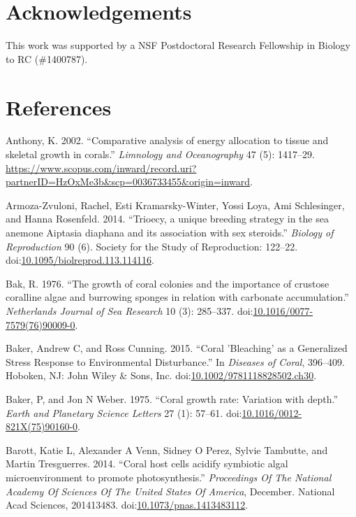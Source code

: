 \documentclass[]{elsarticle} %
\begin{document}
\section{Acknowledgements}\label{acknowledgements}

This work was supported by a NSF Postdoctoral Research Fellowship in
Biology to RC (\#1400787).

\section*{References}\label{references}

\hypertarget{refs}{}
\hypertarget{ref-Anthony:2002tc}{}
Anthony, K. 2002. ``Comparative analysis of energy allocation to tissue
and skeletal growth in corals.'' \emph{Limnology and Oceanography} 47
(5): 1417--29.
\url{https://www.scopus.com/inward/record.uri?partnerID=HzOxMe3b\&scp=0036733455\&origin=inward}.

\hypertarget{ref-ArmozaZvuloni:2014ju}{}
Armoza-Zvuloni, Rachel, Esti Kramarsky-Winter, Yossi Loya, Ami
Schlesinger, and Hanna Rosenfeld. 2014. ``Trioecy, a unique breeding
strategy in the sea anemone Aiptasia diaphana and its association with
sex steroids.'' \emph{Biology of Reproduction} 90 (6). Society for the
Study of Reproduction: 122--22.
doi:\href{https://doi.org/10.1095/biolreprod.113.114116}{10.1095/biolreprod.113.114116}.

\hypertarget{ref-Bak:1976bv}{}
Bak, R. 1976. ``The growth of coral colonies and the importance of
crustose coralline algae and burrowing sponges in relation with
carbonate accumulation.'' \emph{Netherlands Journal of Sea Research} 10
(3): 285--337.
doi:\href{https://doi.org/10.1016/0077-7579(76)90009-0}{10.1016/0077-7579(76)90009-0}.

\hypertarget{ref-Baker:2015kp}{}
Baker, Andrew C, and Ross Cunning. 2015. ``Coral 'Bleaching' as a
Generalized Stress Response to Environmental Disturbance.'' In
\emph{Diseases of Coral}, 396--409. Hoboken, NJ: John Wiley \& Sons,
Inc.
doi:\href{https://doi.org/10.1002/9781118828502.ch30}{10.1002/9781118828502.ch30}.

\hypertarget{ref-Baker:1975ip}{}
Baker, P, and Jon N Weber. 1975. ``Coral growth rate: Variation with
depth.'' \emph{Earth and Planetary Science Letters} 27 (1): 57--61.
doi:\href{https://doi.org/10.1016/0012-821X(75)90160-0}{10.1016/0012-821X(75)90160-0}.

\hypertarget{ref-Barott:2014gx}{}
Barott, Katie L, Alexander A Venn, Sidney O Perez, Sylvie Tambutte, and
Martin Tresguerres. 2014. ``Coral host cells acidify symbiotic algal
microenvironment to promote photosynthesis.'' \emph{Proceedings Of The
National Academy Of Sciences Of The United States Of America}, December.
National Acad Sciences, 201413483.
doi:\href{https://doi.org/10.1073/pnas.1413483112}{10.1073/pnas.1413483112}.
\end{document}
